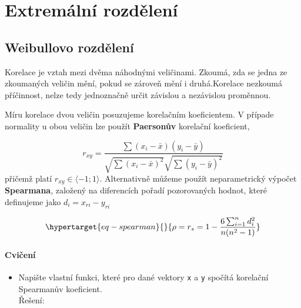 \documentclass[
  letterpaper,
  DIV=11,
  numbers=noendperiod]{scrreprt}
\providecommand{\tightlist}{%
  \setlength{\itemsep}{0pt}\setlength{\parskip}{0pt}}\usepackage{longtable,booktabs,array}
\begin{document}
\hypertarget{extremuxe1lnuxed-rozdux11blenuxed}{%
\chapter{Extremální rozdělení}\label{extremuxe1lnuxed-rozdux11blenuxed}}

\hypertarget{weibullovo-rozdux11blenuxed}{%
\section{Weibullovo rozdělení}\label{weibullovo-rozdux11blenuxed}}

Korelace je vztah mezi dvěma náhodnými veličinami. Zkoumá, zda se jedna
ze zkoumaných veličin mění, pokud se zároveň mění i druhá.Korelace
nezkoumá příčinnost, nelze tedy jednoznačně určit závislou a nezávislou
proměnnou.

Míru korelace dvou veličin posuzujeme korelačním koeficientem. V případe
normality u obou veličin lze použít \textbf{Paersonův} korelační
koeficient,

\[
r_{xy} = \dfrac{\sum(x_i - \bar{x})(y_i - \bar{y})}{\sqrt{\sum(x_i - \bar{x})^2}\sqrt{\sum(y_i - \bar{y})^2}}
\] přičemž platí \(r_{xy}\in\langle-1;1\rangle\). Alternativně můžeme
použít neparametrický výpočet \textbf{Spearmana}, založený na
diferencích pořadí pozorovaných hodnot, které definujeme jako
\(d_i = x_{ri} - y_{ri}\)

\begin{equation}\protect\hypertarget{eq-spearman}{}{
\rho = r_s = 1 - \dfrac{6\sum_{i=1}^{n}d_i^2}{n(n^2-1)} 
}\label{eq-spearman}\end{equation}

\hypertarget{cviux10denuxed-10}{%
\subsubsection*{Cvičení}\label{cviux10denuxed-10}}

\begin{itemize}
\tightlist
\item
  Napište vlastní funkci, které pro dané vektory \texttt{x} a \texttt{y}
  spočítá korelační Spearmanův koeficient.\\
  Řešení:
\end{itemize}
\end{document}
